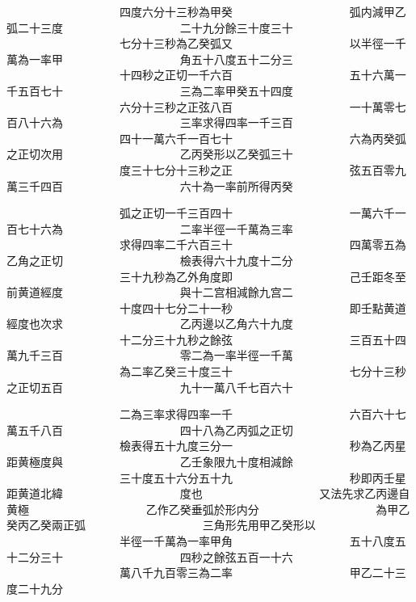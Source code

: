 \begin{正文}
　　　　　　　　　　四度六分十三秒為甲癸
　　　　　　　　　　弧内減甲乙弧二十三度
　　　　　　　　　　二十九分餘三十度三十
　　　　　　　　　　七分十三秒為乙癸弧又
　　　　　　　　　　以半徑一千萬為一率甲
　　　　　　　　　　角五十八度五十二分三
　　　　　　　　　　十四秒之正切一千六百
　　　　　　　　　　五十六萬一千五百七十
　　　　　　　　　　三為二率甲癸五十四度
　　　　　　　　　　六分十三秒之正弦八百
　　　　　　　　　　一十萬零七百八十六為
　　　　　　　　　　三率求得四率一千三百
　　　　　　　　　　四十一萬六千一百七十
　　　　　　　　　　六為丙癸弧之正切次用
　　　　　　　　　　乙丙癸形以乙癸弧三十
　　　　　　　　　　度三十七分十三秒之正
　　　　　　　　　　弦五百零九萬三千四百
　　　　　　　　　　六十為一率前所得丙癸
\par
\end{正文}\clearpage
{}
\begin{正文}
　　　　　　　　　　弧之正切一千三百四十
　　　　　　　　　　一萬六千一百七十六為
　　　　　　　　　　二率半徑一千萬為三率
　　　　　　　　　　求得四率二千六百三十
　　　　　　　　　　四萬零五為乙角之正切
　　　　　　　　　　檢表得六十九度十二分
　　　　　　　　　　三十九秒為乙外角度即
　　　　　　　　　　己壬距冬至前黄道經度
　　　　　　　　　　與十二宫相減餘九宫二
　　　　　　　　　　十度四十七分二十一秒
　　　　　　　　　　即壬點黄道經度也次求
　　　　　　　　　　乙丙邊以乙角六十九度
　　　　　　　　　　十二分三十九秒之餘弦
　　　　　　　　　　三百五十四萬九千三百
　　　　　　　　　　零二為一率半徑一千萬
　　　　　　　　　　為二率乙癸三十度三十
　　　　　　　　　　七分十三秒之正切五百
　　　　　　　　　　九十一萬八千七百六十
\par
\end{正文}\clearpage
{}
\begin{正文}
　　　　　　　　　　二為三率求得四率一千
　　　　　　　　　　六百六十七萬五千八百
　　　　　　　　　　四十八為乙丙弧之正切
　　　　　　　　　　檢表得五十九度三分一
　　　　　　　　　　秒為乙丙星距黄極度與
　　　　　　　　　　乙壬象限九十度相減餘
　　　　　　　　　　三十度五十六分五十九
　　　　　　　　　　秒即丙壬星距黄道北緯
　　　　　　　　　　度也
　　　　　　　　　　又法先求乙丙邊自黄極
　　　　　　　　　　乙作乙癸垂弧於形内分
　　　　　　　　　　為甲乙癸丙乙癸兩正弧
　　　　　　　　　　三角形先用甲乙癸形以
　　　　　　　　　　半徑一千萬為一率甲角
　　　　　　　　　　五十八度五十二分三十
　　　　　　　　　　四秒之餘弦五百一十六
　　　　　　　　　　萬八千九百零三為二率
　　　　　　　　　　甲乙二十三度二十九分
\par
\end{正文}\clearpage
